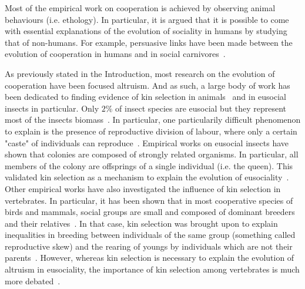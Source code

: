     Most of the empirical work on cooperation is achieved by observing animal behaviours (i.e. ethology). In particular, it is argued that it is possible to come with essential explanations of the evolution of sociality in humans by studying that of non-humans. For example, persuasive links have been made between the evolution of cooperation in humans and in social carnivores~\parencite{Schaller1969, Smith2012a}.


    As previously stated in the Introduction, most research on the evolution of cooperation have been focused altruism. And as such, a large body of work has been dedicated to finding evidence of kin selection in animals~\parencite{Bourke2014} and in eusocial insects in particular. Only $2\%$ of insect species are eusocial but they represent most of the insects biomass~\parencite{Wilson2008}. In particular, one particularily difficult phenomenon to explain is the presence of reproductive division of labour, where only a certain "caste" of individuals can reproduce~\parencite{Wilson1990}. Empirical works on eusocial insects have shown that colonies are composed of strongly related organisms. In particular, all members of the colony are offsprings of a single individual (i.e. the queen). This validated kin selection as a mechanism to explain the evolution of eusociality~\parencite{Queller1998}. Other empirical works have also investigated the influence of kin selection in vertebrates. In particular, it has been shown that in most cooperative species of birds and mammals, social groups are small and composed of dominant breeders and their relatives~\parencite{Dugatkin1997, Clutton-Brock2002}. In that case, kin selection was brought upon to explain inequalities in breeding between individuals of the same group (something called reproductive skew) and the rearing of youngs by individuals which are not their parents~\parencite{Bourke2011}. However, whereas kin selection is necessary to explain the evolution of altruism in eusociality, the importance of kin selection among vertebrates is much more debated~\parencite{Griffin2003, Clutton-Brock2002}.

